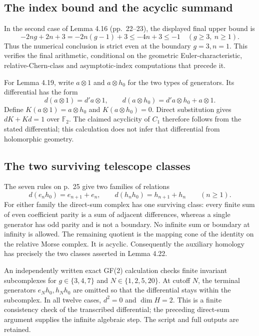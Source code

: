 \documentclass[10pt]{article}
\begin{document}
\subsection*{The index bound and the acyclic summand}
In the second case of Lemma 4.16 (pp. 22–23), the displayed final upper bound is \[-2ng+2n+3=-2n(g-1)+3\leq -4n+3\leq-1
 \quad(g\geq3,\ n\geq1).\] Thus the numerical conclusion is strict even at the boundary \(g=3,n=1\). This verifies the final arithmetic, conditional on the geometric Euler-characteristic, relative-Chern-class and asymptotic-index computations that precede it.\par
For Lemma 4.19, write \(a\otimes1\) and \(a\otimes h_0\) for the two types of generators. Its differential has the form \[d(a\otimes1)=d'a\otimes1,\qquad
 d(a\otimes h_0)=d'a\otimes h_0+a\otimes1.\] Define \(K(a\otimes1)=a\otimes h_0\) and \(K(a\otimes h_0)=0\). Direct substitution gives \(dK+Kd=1\) over \(\mathbb F_2\). The claimed acyclicity of \(C_1\) therefore follows from the stated differential; this calculation does not infer that differential from holomorphic geometry.\par
\subsection*{The two surviving telescope classes}
The seven rules on p. 25 give two families of relations \[d(e_nh_0)=e_{n+1}+e_n,\qquad
 d(h_nh_0)=h_{n+1}+h_n\qquad(n\geq1).\] For either family the direct-sum complex has one surviving class: every finite sum of even coefficient parity is a sum of adjacent differences, whereas a single generator has odd parity and is not a boundary. No infinite sum or boundary at infinity is allowed. The remaining quotient is the mapping cone of the identity on the relative Morse complex. It is acyclic. Consequently the auxiliary homology has precisely the two classes asserted in Lemma 4.22.\par
An independently written exact GF(2) calculation checks finite invariant subcomplexes for \(g\in\{3,4,7\}\) and \(N\in\{1,2,5,20\}\). At cutoff \(N\), the terminal generators \(e_Nh_0,h_Nh_0\) are omitted so that the differential stays within the subcomplex. In all twelve cases, \(d^2=0\) and \(\dim H=2\). This is a finite consistency check of the transcribed differential; the preceding direct-sum argument supplies the infinite algebraic step. The script and full outputs are retained.\par
\end{document}
